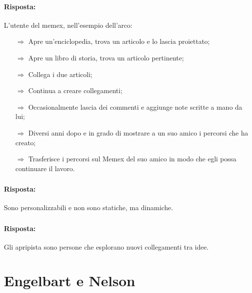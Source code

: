 \paragraph{Risposta:} L'utente del memex, nell'esempio dell'arco:

\begin{itemize}
    \item [$\Rightarrow$] Apre un'enciclopedia, trova un articolo e lo lascia proiettato;
    \item [$\Rightarrow$] Apre un libro di storia, trova un articolo pertinente;
    \item [$\Rightarrow$] Collega i due articoli;
    \item [$\Rightarrow$] Continua a creare collegamenti;
    \item [$\Rightarrow$] Occasionalmente lascia dei commenti e aggiunge note scritte a mano da lui;
    \item [$\Rightarrow$] Diversi anni dopo e in grado di mostrare a un suo amico i percorsi che ha creato;
    \item [$\Rightarrow$] Trasferisce i percorsi sul Memex del suo amico in modo che egli possa continuare il lavoro.
\end{itemize}

\subsubsection{}


\paragraph{Risposta:} Sono personalizzabili e non sono statiche, ma dinamiche.

\subsubsection{}


\paragraph{Risposta:} Gli apripista sono persone che esplorano nuovi collegamenti tra idee.
\pagebreak
\section{Engelbart e Nelson}

